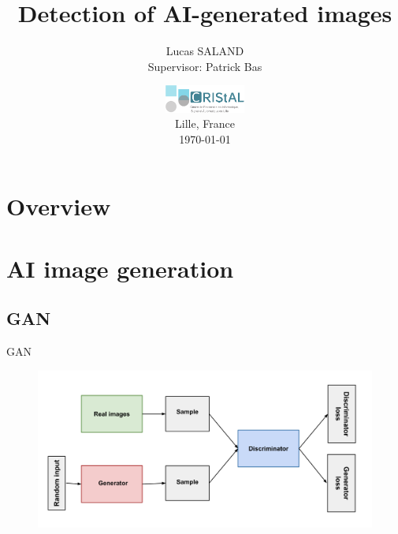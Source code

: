 \documentclass[11pt,compress]{beamer} %
\begin{document}
\title[]{Detection of AI-generated images}
\author{Lucas SALAND\\ Supervisor: Patrick Bas}
\date[\today]{\includegraphics[keepaspectratio,width=0.2\textwidth]{img/cristal.png} \medskip \\ Lille, France \medskip \\ \today}

\frame{\titlepage}

\section*{Overview}
\begin{frame}
  \tableofcontents
\end{frame}

\section{AI image generation}
\subsection{GAN}
\begin{frame}{GAN}
  \begin{figure}
    \includegraphics[width=\textwidth]{img/GAN.png}
  \end{figure}
\end{frame}
\end{document}
